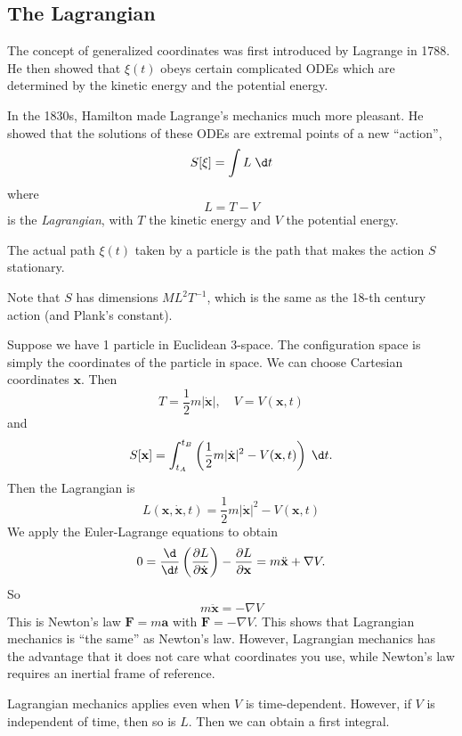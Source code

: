 \documentclass[a4paper]{article}
\begin{document}
\subsection{The Lagrangian}
The concept of generalized coordinates was first introduced by Lagrange in 1788. He then showed that $\xi(t)$ obeys certain complicated ODEs which are determined by the kinetic energy and the potential energy.

In the 1830s, Hamilton made Lagrange's mechanics much more pleasant. He showed that the solutions of these ODEs are extremal points of a new ``action'',
\[
  S[\xi] = \int L\;\d t
\]
where
\[
  L = T - V
\]
is the \emph{Lagrangian}, with $T$ the kinetic energy and $V$ the potential energy.

\begin{law}
  The actual path $\xi(t)$ taken by a particle is the path that makes the action $S$ stationary.
\end{law}

Note that $S$ has dimensions $ML^2T^{-1}$, which is the same as the 18-th century action (and Plank's constant).

\begin{eg}
  Suppose we have 1 particle in Euclidean 3-space. The configuration space is simply the coordinates of the particle in space. We can choose Cartesian coordinates $\mathbf{x}$. Then
  \[
    T = \frac{1}{2}m|\dot{\mathbf{x}}|,\quad V = V(\mathbf{x}, t)
  \]
  and
  \[
    S[\mathbf{x}] = \int_{t_A}^{t_B}\left(\frac{1}{2}m|\dot{\mathbf{x}}|^2 - V(\mathbf{x}, t)\right)\;\d t.
  \]
  Then the Lagrangian is
  \[
    L(\mathbf{x}, \dot{\mathbf{x}}, t) = \frac{1}{2}m|\dot{\mathbf{x}}|^2 - V(\mathbf{x}, t)
  \]
  We apply the Euler-Lagrange equations to obtain
  \[
    0 = \frac{\d}{\d t}\left(\frac{\partial L}{\partial \dot{\mathbf{x}}}\right) - \frac{\partial L}{\partial \mathbf{x}} = m\ddot{\mathbf{x}} + \nabla V.
  \]
  So
  \[
    m\ddot{\mathbf{x}} = -\nabla V
  \]
  This is Newton's law $\mathbf{F} = m\mathbf{a}$ with $\mathbf{F} = -\nabla V$. This shows that Lagrangian mechanics is ``the same'' as Newton's law. However, Lagrangian mechanics has the advantage that it does not care what coordinates you use, while Newton's law requires an inertial frame of reference.
\end{eg}
Lagrangian mechanics applies even when $V$ is time-dependent. However, if $V$ is independent of time, then so is $L$. Then we can obtain a first integral.
\end{document}
